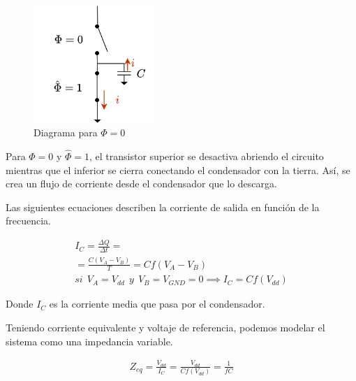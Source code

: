 \documentclass[12pt]{report} %
\begin{document}
	\begin{figure}[H]
		\includegraphics[width=0.4\textwidth]{sw-capacities-symbol-3.png}
		\caption[Diagrama para $\Phi=0$]{Diagrama para $\Phi=0$}
		\label{fig:sw-capacities-symbol-3.png}
	\end{figure}
	Para $\Phi = 0$ y $\hat{\Phi} = 1$, el transistor superior se desactiva abriendo el circuito mientras que el inferior se cierra conectando el condensador con la tierra. Así, se crea un flujo de corriente desde el condensador que lo descarga.
	
	Las siguientes ecuaciones describen la corriente de salida en función de la frecuencia.
	
	\begin{figure}[H]
		\label{sw-capacities-eqs}
		\begin{equation}
		\begin{array}{c}
		I_C = \frac{\Delta Q}{\Delta t} = \\
		= \frac{C(V_{A}-V_{B})}{T} = Cf(V_{A}-V_{B}) \\
		si\ \ V_{A} = V_{dd}\ \ y\ \ V_{B} = V_{GND} = 0 \implies I_C = Cf(V_{dd})
		\end{array}
		\end{equation}
	\end{figure}
	
	Donde $I_C$ es la corriente media que pasa por el condensador.
	
	Teniendo corriente equivalente y voltaje de referencia, podemos modelar el sistema como una impedancia variable.
	
	\begin{figure}[H]
		\label{sw-capacities-var-res}
		\begin{equation}
		\begin{array}{c}
		Z_{eq} = \frac{V_{dd}}{I_C} = \frac{V_{dd}}{Cf(V_{dd})} = \frac{1}{fC} \\
		\end{array}
		\end{equation}
	\end{figure}
	
\end{document}
